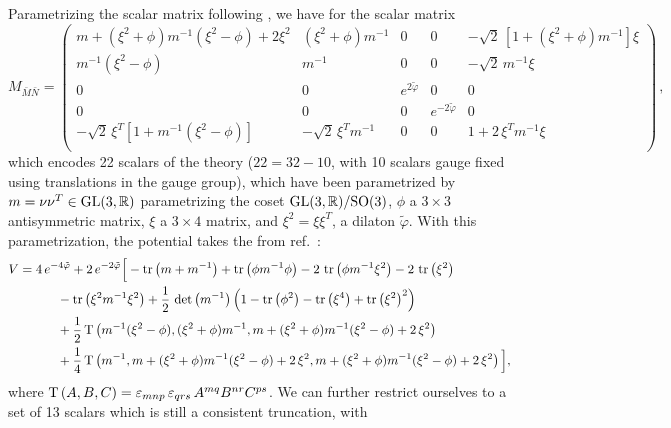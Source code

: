 \documentclass[11pt,a4paper]{article}
\newcommand{\bM}{{\bar{M}}}
\newcommand{\bN}{{\bar{N}}}
\begin{document}
Parametrizing the scalar matrix following \cite{Eloy:2021fhc}, we have for the scalar matrix 
\begin{equation}	\label{eq: scalarmatrix}
	M_{\bM\bN}
	=
	\begin{pmatrix}
		m+(\xi^2+\phi)m^{-1}(\xi^2-\phi)+2\xi^2	& 	(\xi^2+\phi)m^{-1}		&	0	&  0  &	-\sqrt2\,[1+(\xi^2+\phi)m^{-1}]\xi	\\
		m^{-1}(\xi^2-\phi)	& 	m^{-1}	&	0  	&  0  &	-\sqrt2\,m^{-1}\xi	\\
		0		&	0		&	e^{2\tilde\varphi}	&	0				&	0		\\
		0		&	0		&	0				&	e^{-2\tilde\varphi}	&	0		\\
		-\sqrt2\,\xi^T[1+m^{-1}(\xi^2-\phi)]	&	-\sqrt2\,\xi^Tm^{-1}	&	0	&	0	&	1+2\,\xi^Tm^{-1}\xi	\\
	\end{pmatrix}\,,
\end{equation}
which encodes 22 scalars of the theory ($22 = 32 - 10$, with 10 scalars gauge fixed using translations in the gauge group), which have been parametrized by 
$m = \nu\nu^{T}\in{\rm GL}(3,\mathbb{R})$ parametrizing the coset ${\rm GL}(3,\mathbb{R})/{\rm SO}(3)$, $\phi$ a $3\times3$ antisymmetric matrix, $\xi$ a $3\times4$ matrix, and $\xi^{2} = \xi \xi^{T}$, a dilaton $\tilde{\varphi}$. With this parametrization, the potential takes the from ref.~\cite{Eloy:2021fhc}:
\begin{equation} \label{eq:scalarpotential}
	\begin{aligned}
		V & = 4\,e^{-4\tilde\varphi}+2\,e^{-2\tilde\varphi}\Big[-\tr\left(m+m^{-1}\right)+\tr\left(\phi m^{-1}\phi\right) -2\,\tr\left(\phi m^{-1}\xi^{2}\right)-2\,\tr\left(\xi^{2}\right)\\
		&\qquad\quad-\tr\left(\xi^{2}m^{-1}\xi^{2}\right)  +\frac{1}{2}\,\det\left(m^{-1}\right)\left(1-\tr\left(\phi^{2}\right)-\tr\left(\xi^{4}\right)+\tr\left(\xi^{2}\right)^{2}\right) \\
		&\qquad\quad +\frac{1}{2}\,{\rm T}\left(m^{-1}(\xi^{2}-\phi),(\xi^{2}+\phi)m^{-1},m+(\xi^{2}+\phi)m^{-1}(\xi^{2}-\phi)+2\,\xi^{2}\right)\\
		&\qquad\quad +\frac{1}{4}\,{\rm T}\left(m^{-1},m+(\xi^{2}+\phi)m^{-1}(\xi^{2}-\phi)+2\,\xi^{2},m+(\xi^{2}+\phi)m^{-1}(\xi^{2}-\phi)+2\,\xi^{2}\right)\Big], 
	\end{aligned}
\end{equation}
where ${\rm T}\left(A,B,C\right)=\varepsilon_{mnp}\,\varepsilon_{qrs}\,A^{mq}B^{nr}C^{ps}$. We can further restrict ourselves to a set of 13 scalars which is still a consistent truncation, with 
\end{document}
